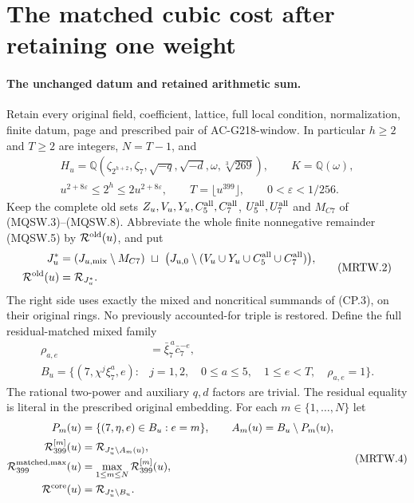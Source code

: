 \section{The matched cubic cost after retaining one weight}
\label{sec:mixed-cubic-residual-trivial-window}

\paragraph{The unchanged datum and retained arithmetic sum.}
Retain every original field, coefficient, lattice, full local condition,
normalization, finite datum, page and prescribed pair of AC-G218-window.
In particular $h\geq2$ and $T\geq2$ are integers, $N=T-1$, and
\[
 \begin{gathered}
 H_u=\mathbb Q(\zeta_{2^{h+2}},\zeta_7,\sqrt{-q},\sqrt{-d},
                         \omega,\sqrt[3]{269}),\qquad K=\mathbb Q(\omega),\\
 u^{2+8\varepsilon}\leq2^h\leq2u^{2+8\varepsilon},\qquad
 T=\lfloor u^{399}\rfloor,\qquad 0<\varepsilon<1/256.
 \end{gathered}\tag{MRTW.1}
\]
Keep the complete old sets $Z_u,V_u,Y_u,C_5^{\rm all},C_7^{\rm all}$,
$U_5^{\rm all},U_7^{\rm all}$ and $M_{C7}$ of (MQSW.3)--(MQSW.8).
Abbreviate the whole finite nonnegative remainder (MQSW.5) by
$\mathcal R^{\rm old}(u)$, and put
\[
 \begin{split}
 J_u^*&=(J_{u,\rm mix}\setminus M_{C7})\ \sqcup\
       \bigl(J_{u,0}\setminus(V_u\cup Y_u\cup C_5^{\rm all}
                                             \cup C_7^{\rm all})\bigr),\\
 \mathcal R^{\rm old}(u)&=\mathcal R_{J_u^*}.
 \end{split}\tag{MRTW.2}
\]
The right side uses exactly the mixed and noncritical summands of
(CP.3), on their original rings. No previously accounted-for triple
is restored. Define the full residual-matched mixed family
\[
 \begin{split}
 \rho_{a,e}&=\bar\xi_7^{\,a}\bar c_7^{-e},\\
 B_u=\{(7,\chi^j\xi_7^a,e):{}&j=1,2,\quad0\leq a\leq5,
               \quad1\leq e<T,\quad\rho_{a,e}=1\}.
 \end{split}\tag{MRTW.3}
\]
The rational two-power and auxiliary $q,d$ factors are trivial.
The residual equality is literal in the prescribed original embedding.
For each $m\in\{1,\ldots,N\}$ let
\[
 \begin{split}
 P_m(u)&=\{(7,\eta,e)\in B_u:e=m\},\qquad
 A_m(u)=B_u\setminus P_m(u),\\
 \mathcal R_{399}^{[m]}(u)&=\mathcal R_{J_u^*\setminus A_m(u)},\\
 \mathcal R_{399}^{\rm matched,max}(u)&=
                   \max_{1\leq m\leq N}\mathcal R_{399}^{[m]}(u),\\
 \mathcal R^{\rm core}(u)&=\mathcal R_{J_u^*\setminus B_u}.
 \end{split}\tag{MRTW.4}
\]
